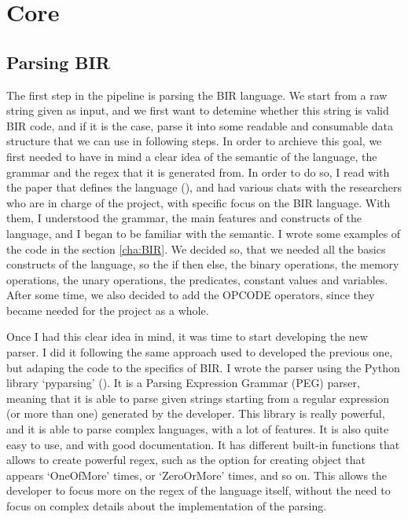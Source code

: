 \chapter{Core}
\label{cha:core}

\section{Parsing BIR}
\label{cha:Parsing BIR} The first step in the pipeline is parsing the BIR
language. We start from a raw string given as input, and we first want to
detemine whether this string is valid BIR code, and if it is the case, parse it
into some readable and consumable data structure that we can use in following
steps. In order to archieve this goal, we first needed to have in mind a clear
idea of the semantic of the language, the grammar and the regex that it is generated
from. In order to do so, I read with the paper that defines the language (\cite{bir_pub}),
and had various chats with the researchers who are in charge of the project, with
specific focus on the BIR language. With them, I understood the grammar, the
main features and constructs of the language, and I began to be familiar with the
semantic. I wrote some examples of the code in the section \ref{cha:BIR}. We decided
so, that we needed all the basics constructs of the language, so the if then else,
the binary operations, the memory operations, the unary operations, the predicates,
constant values and variables. After some time, we also decided to add the
OPCODE operators, since they became needed for the project as a whole.

Once I had this clear idea in mind, it was time to start developing the new
parser. I did it following the same approach used to developed the previous one,
but adaping the code to the specifics of BIR. I wrote the parser using the Python
library `pyparsing' (\cite{pyparsing}). It is a Parsing Expression Grammar (PEG)
parser, meaning that it is able to parse given strings starting from a regular expression
(or more than one) generated by the developer. This library is really powerful, and
it is able to parse complex languages, with a lot of features. It is also quite easy
to use, and with good documentation. It has different built-in functions that allows
to create powerful regex, such as the option for creating object that appears `OneOfMore'
times, or `ZeroOrMore' times, and so on. This allows the developer to focus more
on the regex of the language itself, without the need to focus on complex
details about the implementation of the parsing.

